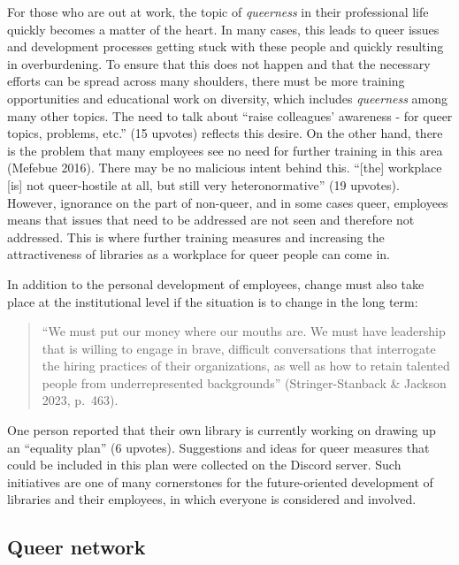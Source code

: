 \documentclass[a4paper,
fontsize=11pt,
oneside,
numbers=noperiodatend,
parskip=half-,
bibliography=totoc,
final
]{scrartcl}
\begin{document}
For those who are out at work, the topic of \emph{queerness} in their
professional life quickly becomes a matter of the heart. In many cases,
this leads to queer issues and development processes getting stuck with
these people and quickly resulting in overburdening. To ensure that this
does not happen and that the necessary efforts can be spread across many
shoulders, there must be more training opportunities and educational
work on diversity, which includes \emph{queerness} among many other
topics. The need to talk about \enquote{raise colleagues' awareness - for queer
topics, problems, etc.} (15 upvotes) reflects this desire. On the other
hand, there is the problem that many employees see no need for further
training in this area (Mefebue 2016). There may be no malicious intent
behind this. \enquote{{[}the{]} workplace {[}is{]} not queer-hostile at all, but
still very heteronormative} (19 upvotes). However, ignorance on the part
of non-queer, and in some cases queer, employees means that issues that
need to be addressed are not seen and therefore not addressed. This is
where further training measures and increasing the attractiveness of
libraries as a workplace for queer people can come in.

In addition to the personal development of employees, change must also
take place at the institutional level if the situation is to change in
the long term:

\begin{quote}
\enquote{We must put our money where our mouths are. We must have leadership
that is willing to engage in brave, difficult conversations that
interrogate the hiring practices of their organizations, as well as how
to retain talented people from underrepresented backgrounds}
(Stringer-Stanback \& Jackson 2023, p.~463).
\end{quote}

One person reported that their own library is currently working on
drawing up an \enquote{equality plan} (6 upvotes). Suggestions and ideas for
queer measures that could be included in this plan were collected on the
Discord server. Such initiatives are one of many cornerstones for the
future-oriented development of libraries and their employees, in which
everyone is considered and involved.

\hypertarget{queer-network}{%
\subsection{Queer network}\label{queer-network}}
\end{document}
